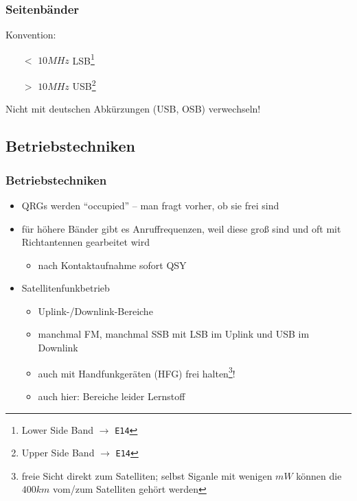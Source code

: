 \begin{frame}
    \frametitle{Seitenbänder}

    Konvention: \bigskip

	\begin{itemize}
    	\item [$<$] $10 MHz$ LSB\footnote{Lower Side Band $\rightarrow$ \texttt{E14}} \\[1em]
    	\item [$>$] $10 MHz$ USB\footnote{Upper Side Band $\rightarrow$ \texttt{E14}} \\[3em]
	\end{itemize}

    Nicht mit deutschen Abkürzungen (USB, OSB) verwechseln!

\end{frame}

\subsection{Betriebstechniken}

\begin{frame}
    \frametitle{Betriebstechniken}

    \begin{itemize}
        \item QRGs werden ``occupied'' -- man fragt vorher, ob sie frei sind
        \item für höhere Bänder gibt es Anruf\/frequenzen, weil diese groß sind und oft mit
              Richtantennen gearbeitet wird
        \begin{itemize}
            \item nach Kontaktaufnahme sofort QSY
        \end{itemize}
        \item Satellitenfunkbetrieb
        \begin{itemize}
            \item Uplink-/Downlink-Bereiche
            \item manchmal FM, manchmal SSB mit LSB im Uplink und USB im Downlink
            \item auch mit Handfunkgeräten (HFG) frei halten\footnote{freie
                  Sicht direkt zum Satelliten; selbst Siganle mit wenigen $mW$
                  können die $400km$ vom/zum Satelliten gehört werden}!
            \item auch hier: Bereiche leider Lernstoff
        \end{itemize}
    \end{itemize}

\end{frame}

